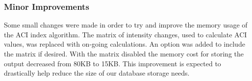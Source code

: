 \subsubsection{Minor Improvements}
Some small changes were made in order to try and improve the memory usage of the ACI index algorithm. The matrix of intensity changes, used to calculate ACI values, was replaced with on-going calculations. An option was added to include the matrix if desired. With the matrix disabled the memory cost for storing the output decreased from 80KB to 15KB. This improvement is expected to drastically help reduce the size of our database storage needs.